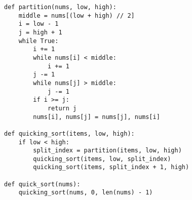 \noindent\begin{minipage}{\textwidth}
\begin{lstlisting}[caption=Быстрая сортировка]
def partition(nums, low, high):
    middle = nums[(low + high) // 2]
    i = low - 1
    j = high + 1
    while True:
        i += 1
        while nums[i] < middle:
            i += 1
        j -= 1
        while nums[j] > middle:
            j -= 1
        if i >= j:
            return j
        nums[i], nums[j] = nums[j], nums[i]

def quicking_sort(items, low, high):
    if low < high:
        split_index = partition(items, low, high)
        quicking_sort(items, low, split_index)
        quicking_sort(items, split_index + 1, high)

def quick_sort(nums):
    quicking_sort(nums, 0, len(nums) - 1)
\end{lstlisting}
\end{minipage}


